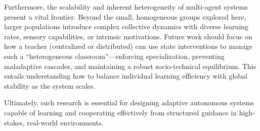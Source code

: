 \documentclass[10pt,letterpaper]{article}
\begin{document}
Furthermore, the scalability and inherent heterogeneity of multi-agent systems present a vital frontier. Beyond the small, homogeneous groups explored here, larger populations introduce complex collective dynamics with diverse learning rates, sensory capabilities, or intrinsic motivations. Future work should focus on how a teacher (centralized or distributed) can use state interventions to manage such a ``heterogeneous classroom''—enforcing specialization, preventing maladaptive cascades, and maintaining a robust socio-technical equilibrium. This entails understanding how to balance individual learning efficiency with global stability as the system scales.

Ultimately, such research is essential for designing adaptive autonomous systems capable of learning and cooperating effectively from structured guidance in high-stakes, real-world environments.



\setlength{\bibleftmargin}{.125in}
\setlength{\bibindent}{-\bibleftmargin}


\appendix

\end{document}
